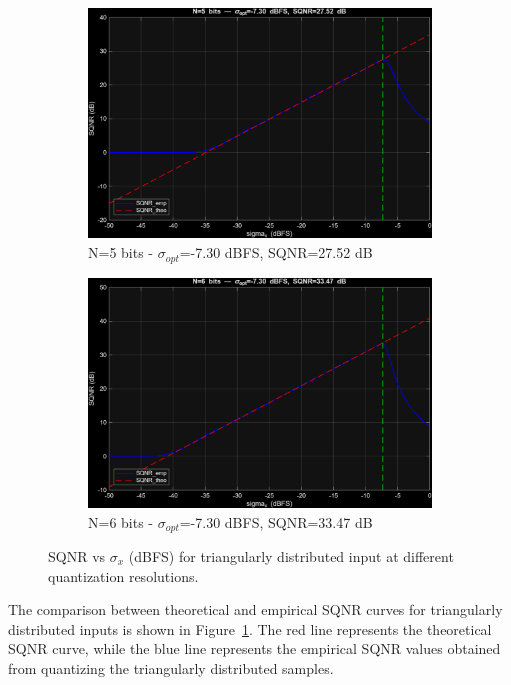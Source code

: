 \documentclass[11pt,a4paper]{article}
\begin{document}
\begin{figure}[H]
    \begin{subfigure}[t]{.4\textwidth}
        \centering
        \includegraphics[width=\linewidth]{img/task3_tri_n5.png}
        \caption{N=5 bits - $\sigma_{opt}$=-7.30 dBFS, SQNR=27.52 dB}
    \end{subfigure}
    \hfill
    \begin{subfigure}[t]{.4\textwidth}
        \centering
        \includegraphics[width=\linewidth]{img/task3_tri_n6.png}
        \caption{N=6 bits - $\sigma_{opt}$=-7.30 dBFS, SQNR=33.47 dB}
    \end{subfigure}

    \caption{SQNR vs $\sigma_x$ (dBFS) for triangularly distributed input at different quantization resolutions.}
    \label{fig:task3_tri_sqnr_vs_sigma}
\end{figure}

The comparison between theoretical and empirical SQNR curves for triangularly distributed inputs is shown in Figure~\ref{fig:task3_tri_sqnr_vs_sigma}.
The red line represents the theoretical SQNR curve, while the blue line represents the empirical SQNR values obtained from quantizing the triangularly distributed samples.
\end{document}
